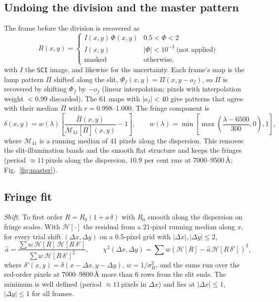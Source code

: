 \subsection{Undoing the division and the master pattern}
\label{sec:fringe_master}
The frame before the division is recovered as
\begin{equation}
R(x,y)=\begin{cases} I(x,y)\,\Phi(x,y) & 0.5<\Phi<2\\ I(x,y) & |\Phi|<10^{-3}\ \text{(not applied)}\\
\text{masked} & \text{otherwise,}\end{cases}
\label{eq:undo}
\end{equation}
with $I$ the \texttt{SCI} image, and likewise for the uncertainty. Each frame's map is the lamp pattern
$\Pi$ shifted along the slit, $\Phi_f(x,y)=\Pi(x,y-o_f)$, so $\Pi$ is recovered by shifting $\Phi_f$ by $-o_f$
(linear interpolation; pixels with interpolation weight $<0.99$ discarded). The 61 maps with $|o_f|<40$ give
patterns that agree with their median $\bar\Pi$ with $r=0.998$--1.000. The fringe component is
\begin{equation}
\delta(x,y) = w(\lambda)\left[\frac{\bar\Pi(x,y)}{\mathcal{M}_{41}[\bar\Pi](x,y)}-1\right],\qquad
w(\lambda)=\min\!\left[\max\!\left(\frac{\lambda-6500}{300},0\right),1\right],
\label{eq:delta}
\end{equation}
where $\mathcal{M}_{41}$ is a running median of 41 pixels along the dispersion. This removes the slit-illumination
bands and the smooth flat structure and keeps the fringes (period $\approx11$\,pixels along the dispersion,
10.9 per cent rms at 7000--9500\,\AA; Fig.~\ref{fig:master}).

\subsection{Fringe fit}
\label{sec:fringe_fit}
\textit{Shift.} To first order $R=R_0(1+a\,\delta)$ with $R_0$ smooth along the dispersion on fringe scales. With
$\mathcal{H}[\cdot]$ the residual from a 21-pixel running median along $x$, for every trial shift $(\Delta x,\Delta y)$
on a 0.5-pixel grid with $|\Delta x|,|\Delta y|\le2$,
\begin{equation}
\hat a=\frac{\sum w\,\mathcal{H}[R]\,\mathcal{H}[R\,\delta']}{\sum w\,\mathcal{H}[R\,\delta']^2},\qquad
\chi^2(\Delta x,\Delta y)=\sum w\left(\mathcal{H}[R]-\hat a\,\mathcal{H}[R\,\delta']\right)^2,
\label{eq:fringe2d}
\end{equation}
where $\delta'(x,y)=\delta(x-\Delta x,y-\Delta y)$, $w=1/\sigma_R^2$, and the sums run over the red-order pixels at
7000--9800\,\AA{} more than 6 rows from the slit ends. The minimum is well defined (period $\approx11$\,pixels in
$\Delta x$) and lies at $|\Delta x|\le1$, $|\Delta y|\le1$ for all frames.

